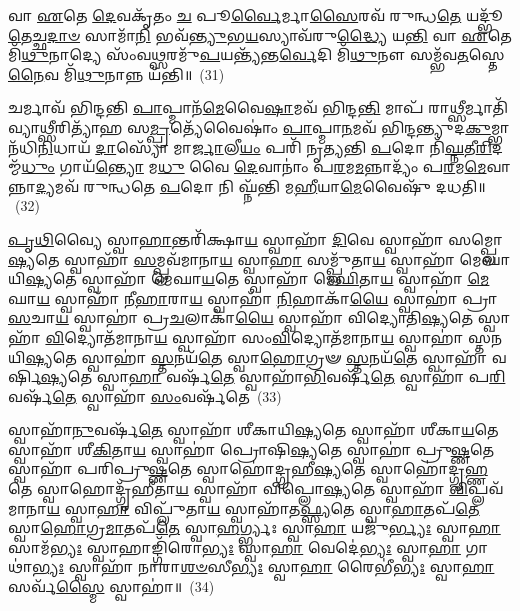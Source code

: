 {%
𑌵𑌾 \ul{𑌏}\-𑌤𑍇 \ul{𑌦𑍇}\-𑌵𑌕𑍃᳴𑌤𑌂 \ul{𑌚} 𑌪𑍂\-\ul{𑌰𑍍𑌵𑍈}\-𑌰𑍍𑌮𑌾\-\ul{𑌸𑍈}\-𑌰𑌵᳴ 𑌰𑍁𑌨𑍍𑌧\-\ul{𑌤𑍇} 𑌯𑌦𑍍𑌭𑍂᳴\-\ul{𑌤𑍇}\-𑌚𑍍𑌛\-\ul{𑌦𑌾}\-\-\ul{𑍞} 𑌸𑌾𑌮𑌾᳴\-\ul{𑌨𑌿} 𑌭𑌵᳴\-\ul{𑌨𑍍𑌤𑍍𑌯𑍁}\-𑌭\-\ul{𑌯}\-𑌸𑍍𑌯𑌾𑌵᳴𑌰𑍁\-\ul{𑌦𑍍𑌧𑍍𑌯𑍈} 𑌯\-\ul{𑌨𑍍𑌤𑌿} 𑌵𑌾 \ul{𑌏}\-𑌤𑍇 𑌮𑌿᳴\-\ul{𑌥𑍁}\-𑌨𑌾𑌦𑍍𑌯𑍇 𑌸𑌂᳴𑌵\-\ul{𑌥𑍍𑌸}\-𑌰𑌮𑍁᳴\-\ul{𑌪}\-𑌯𑌨𑍍𑌤𑍍𑌯᳴𑌨𑍍𑌤\-\ul{𑌰𑍍𑌵𑍇}\-𑌦𑌿 𑌮𑌿᳴\-\ul{𑌥𑍁}\-𑌨𑍗 𑌸𑌮𑍍𑌭᳴𑌵\-\ul{𑌤}\-𑌸𑍍𑌤𑍇\-\ul{𑌨𑍈}\-𑌵 𑌮𑌿᳴\-\ul{𑌥𑍁}\-𑌨𑌾𑌨𑍍𑌨 𑌯᳴𑌨𑍍𑌤𑌿॥~(31)

{\anuvakamend[{𑌵𑍍𑌯𑍃᳴\-\ul{𑌦𑍍𑌧}\-𑌮𑌕𑍍𑌷𑍋᳴𑌧𑍁\-\ul{𑌕𑌾}\-𑌸𑍍𑌤𑌾𑍞 𑌸𑌮𑌾𑌂॑ \ul{𑌪𑍍𑌰}\-𑌜𑌾𑌃 𑌪᳴\-\ul{𑌰}\-𑌮𑌾\-\ul{𑌮𑍇}\-𑌵 𑌚᳴ \ul{𑌤𑍍𑌰𑌿}\-\-\ul{𑍞}\-𑌶𑌚𑍍𑌚᳴}]}%

𑌚𑌰𑍍𑌮𑌾𑌵᳴ 𑌭𑌿𑌨𑍍𑌦𑌨𑍍𑌤𑌿 \ul{𑌪𑌾}\-𑌪𑍍𑌮𑌾𑌨᳴\-\ul{𑌮𑍇}\-𑌵𑍈\-\ul{𑌷𑌾}\-𑌮𑌵᳴ 𑌭𑌿𑌨𑍍𑌦\-\ul{𑌨𑍍𑌤𑌿} 𑌮𑌾𑌪᳴ 𑌰𑌾\-\ul{𑌥𑍍𑌸𑍀}\-𑌰𑍍𑌮𑌾𑌤𑌿᳴ 𑌵𑍍𑌯𑌾\-\ul{𑌥𑍍𑌸𑍀}\-𑌰𑌿𑌤𑍍𑌯𑌾᳴𑌹 𑌸\-\ul{𑌮𑍍𑌪𑍍𑌰}\-𑌤𑍍𑌯𑍇᳴𑌵𑍈𑌷𑌾𑌂॑ \ul{𑌪𑌾}\-𑌪𑍍𑌮𑌾\-\ul{𑌨}\-𑌮𑌵᳴ 𑌭𑌿𑌨𑍍𑌦𑌨𑍍𑌤𑍍𑌯𑍁𑌦\-\ul{𑌕𑍁}\-𑌮𑍍𑌭𑌾𑌨᳴𑌧𑌿\-\ul{𑌨𑌿}\-𑌧𑌾𑌯᳴ \ul{𑌦𑌾}\-𑌸𑍍𑌯𑍋᳴ 𑌮𑌾\-\ul{𑌰𑍍𑌜𑌾}\-𑌲𑍀\-\ul{𑌯𑌂} 𑌪𑌰𑌿᳴ 𑌨𑍃𑌤𑍍𑌯𑌨𑍍𑌤𑌿 \ul{𑌪}\-𑌦𑍋 𑌨𑌿᳴\-\ul{𑌘𑍍𑌨}\-𑌤𑍀\-\ul{𑌰𑌿}\-𑌦𑌮𑍍𑌮᳴\-\ul{𑌧𑍁𑌂} 𑌗𑌾𑌯᳴\-\ul{𑌨𑍍𑌤𑍍𑌯𑍋} 𑌮\-\ul{𑌧𑍁} 𑌵𑍈 \ul{𑌦𑍇}\-𑌵𑌾𑌨𑌾𑌂॑ 𑌪\-\ul{𑌰}\-𑌮\-\ul{𑌮}\-𑌨𑍍𑌨𑌾𑌦𑍍𑌯𑌂᳴ 𑌪\-\ul{𑌰}\-𑌮\-\ul{𑌮𑍇}\-𑌵𑌾𑌨𑍍𑌨𑌾\-\ul{𑌦𑍍𑌯}\-𑌮𑌵᳴ 𑌰𑍁𑌨𑍍𑌧𑌤𑍇 \ul{𑌪}\-𑌦𑍋 𑌨𑌿 𑌘𑍍𑌨᳴𑌨𑍍𑌤𑌿 𑌮\-\ul{𑌹𑍀}\-𑌯𑌾\-\ul{𑌮𑍇}\-𑌵𑍈𑌷𑍁᳴ 𑌦𑌧𑌤𑌿॥~(32)

{\anuvakamend[{𑌚𑌰𑍍𑌮𑍈\-\ul{𑌕𑌾}\-𑌨𑍍𑌨𑌪᳴\-\ul{𑌞𑍍𑌚𑌾}\-𑌶𑌤𑍍}]}%

\-\ul{𑌪𑍃}\-\-\ul{𑌥𑌿}\-𑌵𑍍𑌯𑍈 𑌸𑍍𑌵𑌾\-\ul{𑌹𑌾}\-𑌨𑍍𑌤𑌰𑌿᳴𑌕𑍍𑌷𑌾\-\ul{𑌯} 𑌸𑍍𑌵𑌾𑌹𑌾᳴ \ul{𑌦𑌿}\-𑌵𑍇 𑌸𑍍𑌵𑌾𑌹𑌾᳴ 𑌸𑌮𑍍𑌪𑍍𑌲𑍋\-\ul{𑌷𑍍𑌯}\-𑌤𑍇 𑌸𑍍𑌵𑌾𑌹𑌾᳴ \ul{𑌸}\-𑌮𑍍𑌪𑍍𑌲𑌵᳴𑌮𑌾𑌨𑌾\-\ul{𑌯} 𑌸𑍍𑌵𑌾\-\ul{𑌹𑌾} 𑌸𑌮𑍍𑌪𑍍𑌲𑍁᳴𑌤𑌾\-\ul{𑌯} 𑌸𑍍𑌵𑌾𑌹𑌾᳴ 𑌮𑍇𑌘𑌾𑌯𑌿\-\ul{𑌷𑍍𑌯}\-𑌤𑍇 𑌸𑍍𑌵𑌾𑌹𑌾᳴ 𑌮𑍇𑌘𑌾\-\ul{𑌯}\-𑌤𑍇 𑌸𑍍𑌵𑌾𑌹𑌾᳴ 𑌮𑍇\-\ul{𑌘𑌿}\-𑌤𑌾\-\ul{𑌯} 𑌸𑍍𑌵𑌾𑌹𑌾᳴ \ul{𑌮𑍇}\-𑌘𑌾\-\ul{𑌯} 𑌸𑍍𑌵𑌾𑌹𑌾᳴ 𑌨𑍀\-\ul{𑌹𑌾}\-𑌰𑌾\-\ul{𑌯} 𑌸𑍍𑌵𑌾𑌹𑌾᳴ \ul{𑌨𑌿}\-𑌹𑌾𑌕𑌾᳴\-\ul{𑌯𑍈} 𑌸𑍍𑌵𑌾𑌹𑌾॑ 𑌪𑍍𑌰𑌾\-\ul{𑌸}\-𑌚𑌾\-\ul{𑌯} 𑌸𑍍𑌵𑌾𑌹𑌾॑ 𑌪𑍍𑌰\-\ul{𑌚}\-𑌲𑌾𑌕𑌾᳴\-\ul{𑌯𑍈} 𑌸𑍍𑌵𑌾𑌹𑌾᳴ 𑌵𑌿𑌦𑍍𑌯𑍋𑌤𑌿\-\ul{𑌷𑍍𑌯}\-𑌤𑍇 𑌸𑍍𑌵𑌾𑌹𑌾᳴ \ul{𑌵𑌿}\-𑌦𑍍𑌯𑍋𑌤᳴𑌮𑌾𑌨𑌾\-\ul{𑌯} 𑌸𑍍𑌵𑌾𑌹𑌾᳴ 𑌸𑌂\-\ul{𑌵𑌿}\-𑌦𑍍𑌯𑍋𑌤᳴𑌮𑌾𑌨𑌾\-\ul{𑌯} 𑌸𑍍𑌵𑌾𑌹𑌾॑ 𑌸𑍍𑌤𑌨𑌯𑌿\-\ul{𑌷𑍍𑌯}\-𑌤𑍇 𑌸𑍍𑌵𑌾𑌹𑌾॑ \ul{𑌸𑍍𑌤}\-𑌨𑌯᳴\-\ul{𑌤𑍇} 𑌸𑍍𑌵𑌾\-\ul{𑌹𑍋}\-𑌗𑍍𑌰𑍟 \ul{𑌸𑍍𑌤}\-𑌨𑌯᳴\-\ul{𑌤𑍇} 𑌸𑍍𑌵𑌾𑌹𑌾᳴ 𑌵𑌰𑍍\mbox{}𑌷𑌿\-\ul{𑌷𑍍𑌯}\-𑌤𑍇 𑌸𑍍𑌵𑌾\-\ul{𑌹𑌾} 𑌵𑌰𑍍\mbox{}𑌷᳴\-\ul{𑌤𑍇} 𑌸𑍍𑌵𑌾𑌹𑌾᳴\-\ul{𑌭𑌿}\-𑌵𑌰𑍍\mbox{}𑌷᳴\-\ul{𑌤𑍇} 𑌸𑍍𑌵𑌾𑌹𑌾᳴ 𑌪\-\ul{𑌰𑌿}\-𑌵𑌰𑍍\mbox{}𑌷᳴\-\ul{𑌤𑍇} 𑌸𑍍𑌵𑌾𑌹𑌾᳴ \ul{𑌸𑌂}\-𑌵𑌰𑍍\mbox{}𑌷᳴𑌤𑍇~(33)

𑌸𑍍𑌵𑌾𑌹𑌾᳴\-\ul{𑌨𑍁}\-𑌵𑌰𑍍\mbox{}𑌷᳴\-\ul{𑌤𑍇} 𑌸𑍍𑌵𑌾𑌹𑌾᳴ 𑌶𑍀𑌕𑌾𑌯𑌿\-\ul{𑌷𑍍𑌯}\-𑌤𑍇 𑌸𑍍𑌵𑌾𑌹𑌾᳴ 𑌶𑍀𑌕𑌾\-\ul{𑌯}\-𑌤𑍇 𑌸𑍍𑌵𑌾𑌹𑌾᳴ 𑌶𑍀\-\ul{𑌕𑌿}\-𑌤𑌾\-\ul{𑌯} 𑌸𑍍𑌵𑌾𑌹𑌾॑ 𑌪𑍍𑌰𑍋𑌷𑌿\-\ul{𑌷𑍍𑌯}\-𑌤𑍇 𑌸𑍍𑌵𑌾𑌹𑌾॑ 𑌪𑍍𑌰𑍁\-\ul{𑌷𑍍𑌣}\-𑌤𑍇 𑌸𑍍𑌵𑌾𑌹𑌾᳴ 𑌪𑌰𑌿𑌪𑍍𑌰𑍁\-\ul{𑌷𑍍𑌣}\-𑌤𑍇 𑌸𑍍𑌵𑌾𑌹𑍋॑𑌦𑍍𑌗𑍍𑌰𑌹𑍀\-\ul{𑌷𑍍𑌯}\-𑌤𑍇 𑌸𑍍𑌵𑌾𑌹𑍋॑𑌦𑍍𑌗𑍃\-\ul{𑌹𑍍𑌣}\-𑌤𑍇 𑌸𑍍𑌵𑌾𑌹𑍋𑌦𑍍𑌗𑍃᳴𑌹𑍀𑌤𑌾\-\ul{𑌯} 𑌸𑍍𑌵𑌾𑌹𑌾᳴ 𑌵𑌿𑌪𑍍𑌲𑍋\-\ul{𑌷𑍍𑌯}\-𑌤𑍇 𑌸𑍍𑌵𑌾𑌹𑌾᳴ \ul{𑌵𑌿}\-𑌪𑍍𑌲𑌵᳴𑌮𑌾𑌨𑌾\-\ul{𑌯} 𑌸𑍍𑌵𑌾\-\ul{𑌹𑌾} 𑌵𑌿𑌪𑍍𑌲𑍁᳴𑌤𑌾\-\ul{𑌯} 𑌸𑍍𑌵𑌾𑌹𑌾᳴𑌤\-\ul{𑌫𑍍𑌸𑍍𑌯}\-𑌤𑍇 𑌸𑍍𑌵𑌾\-\ul{𑌹𑌾}\-𑌤𑌪᳴\-\ul{𑌤𑍇} 𑌸𑍍𑌵𑌾\-\ul{𑌹𑍋}\-𑌗𑍍𑌰\-\ul{𑌮𑌾}\-𑌤𑌪᳴\-\ul{𑌤𑍇} 𑌸𑍍𑌵𑌾\-\ul{𑌹}\-𑌰𑍍𑌗𑍍𑌭𑍍𑌯𑌃 𑌸𑍍𑌵𑌾\-\ul{𑌹𑌾} 𑌯𑌜𑍁᳴\-\ul{𑌰𑍍𑌭𑍍𑌯𑌃} 𑌸𑍍𑌵𑌾\-\ul{𑌹𑌾} 𑌸𑌾𑌮᳴\-\ul{𑌭𑍍𑌯𑌃} 𑌸𑍍𑌵𑌾𑌹𑌾𑌙𑍍𑌗𑌿᳴𑌰𑍋\-\ul{𑌭𑍍𑌯𑌃} 𑌸𑍍𑌵𑌾\-\ul{𑌹𑌾} 𑌵𑍇𑌦𑍇॑\-\ul{𑌭𑍍𑌯𑌃} 𑌸𑍍𑌵𑌾\-\ul{𑌹𑌾} 𑌗𑌾𑌥𑌾॑\-\ul{𑌭𑍍𑌯𑌃} 𑌸𑍍𑌵𑌾𑌹𑌾᳴ 𑌨𑌾𑌰𑌾\-\ul{𑌶}\-\-\ul{𑍞}\-𑌸𑍀\-\ul{𑌭𑍍𑌯𑌃} 𑌸𑍍𑌵𑌾\-\ul{𑌹𑌾} 𑌰𑍈𑌭𑍀॑\-\ul{𑌭𑍍𑌯𑌃} 𑌸𑍍𑌵𑌾\-\ul{𑌹𑌾} 𑌸𑌰𑍍𑌵᳴\-\ul{𑌸𑍍𑌮𑍈} 𑌸𑍍𑌵𑌾𑌹𑌾॑॥~(34)

}
